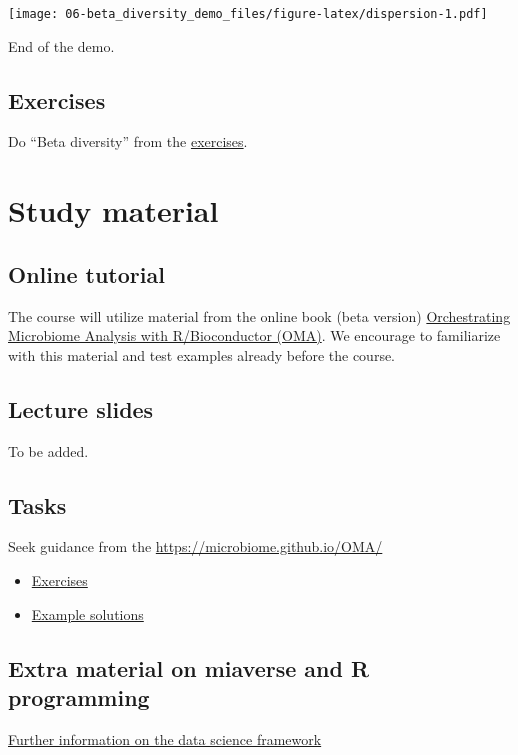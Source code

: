 \documentclass[
  oneside]{book}
\begin{document}
\texttt{[image: 06-beta\_diversity\_demo\_files/figure-latex/dispersion-1.pdf]}

End of the demo.

\hypertarget{exercises-1}{%
\section{Exercises}\label{exercises-1}}

Do ``Beta diversity'' from the \href{https://microbiome.github.io/OMA/exercises.html}{exercises}.

\hypertarget{material}{%
\chapter{Study material}\label{material}}

\hypertarget{online-tutorial}{%
\section{Online tutorial}\label{online-tutorial}}

The course will utilize material from the online book (beta version)
\href{https://microbiome.github.io/OMA/}{Orchestrating Microbiome Analysis with R/Bioconductor
(OMA)}. We encourage to familiarize
with this material and test examples already before the course.

\hypertarget{lecture-slides}{%
\section{Lecture slides}\label{lecture-slides}}

To be added.

\hypertarget{tasks}{%
\section{Tasks}\label{tasks}}

Seek guidance from the \url{https://microbiome.github.io/OMA/}

\begin{itemize}
\item
  \href{https://microbiome.github.io/OMA/exercises.html}{Exercises}
\item
  \href{https://github.com/microbiome/course_2022_radboud/blob/main/example_solutions.Rmd}{Example solutions}
\end{itemize}

\hypertarget{extra-material-on-miaverse-and-r-programming}{%
\section{Extra material on miaverse and R programming}\label{extra-material-on-miaverse-and-r-programming}}

\href{https://microbiome.github.io/OMA/resources.html}{Further information on the data science framework}

  
\end{document}
